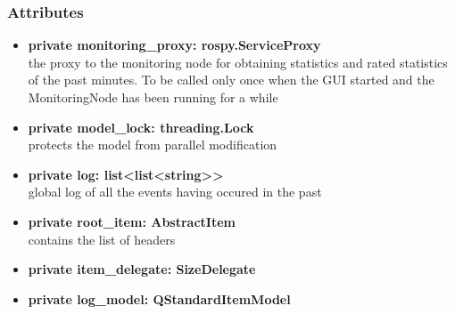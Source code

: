 \subsubsection{Attributes}
\begin{itemize}
  \item \textbf{private monitoring\_proxy: rospy.ServiceProxy}\\ 
  the proxy to the monitoring node for obtaining statistics and rated statistics of the past minutes. To be called only once when the GUI started and the MonitoringNode has been running for a while
  \item \textbf{private model\_lock: threading.Lock}\\ 
  protects the model from parallel modification
  \item \textbf{private log: list<list<string>>}\\ 
  global log of all the events having occured in the past  
  \item \textbf{private root\_item: AbstractItem}\\
  contains the list of headers
  \item \textbf{private item\_delegate: SizeDelegate}\\
  
  \item \textbf{private log\_model: QStandardItemModel}\\
   
\end{itemize}
